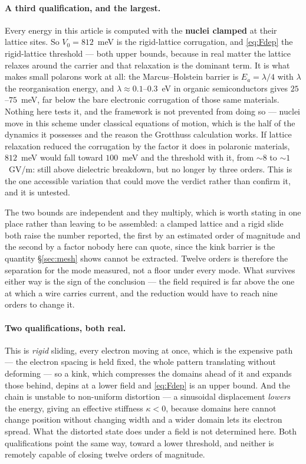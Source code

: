 \documentclass[11pt]{article}
\begin{document}
\paragraph{A third qualification, and the largest.} Every energy in this article is computed
with the \textbf{nuclei clamped} at their lattice sites. So $V_0=812$~meV is the rigid-lattice
corrugation, and \eqref{eq:Fdep} the rigid-lattice threshold --- both upper bounds, because in real
matter the lattice relaxes around the carrier and that relaxation is the dominant term. It is what
makes small polarons work at all: the Marcus--Holstein barrier is $E_a=\lambda/4$ with $\lambda$ the
reorganisation energy, and $\lambda\approx0.1$--$0.3$~eV in organic semiconductors gives
$25$--$75$~meV, far below the bare electronic corrugation of those same materials. Nothing here
tests it, and the framework is not prevented from doing so --- nuclei move in this scheme under
classical equations of motion, which is the half of the dynamics it possesses and the reason the
Grotthuss calculation works. If lattice relaxation reduced the corrugation by the factor it does in
polaronic materials, $812$~meV would fall toward $100$~meV and the threshold with it, from
${\sim}8$ to ${\sim}1$~GV/m: still above dielectric breakdown, but no longer by three orders. This
is the one accessible variation that could move the verdict rather than confirm it, and it is
untested.

The two bounds are independent and they multiply, which is worth stating in one place rather than
leaving to be assembled: a clamped lattice and a rigid slide both raise the number reported, the
first by an estimated order of magnitude and the second by a factor nobody here can quote, since the
kink barrier is the quantity \S\ref{sec:mesh} shows cannot be extracted. Twelve orders is therefore
the separation for the mode measured, not a floor under every mode. What survives either way is the
sign of the conclusion --- the field required is far above the one at which a wire carries current,
and the reduction would have to reach nine orders to change it.

\paragraph{Two qualifications, both real.} This is \emph{rigid} sliding, every electron moving at
once, which is the expensive path --- the electron spacing is held fixed, the whole pattern
translating without deforming --- so a kink, which compresses the domains ahead of it and expands
those behind, depins at a lower field and \eqref{eq:Fdep} is an upper bound. And the chain is unstable to non-uniform distortion --- a sinusoidal displacement
\emph{lowers} the energy, giving an effective stiffness $\kappa<0$, because domains here cannot
change position without changing width and a wider domain lets its electron spread. What the
distorted state does under a field is not determined here. Both qualifications point the same way,
toward a lower threshold, and neither is remotely capable of closing twelve orders of magnitude.
\end{document}

